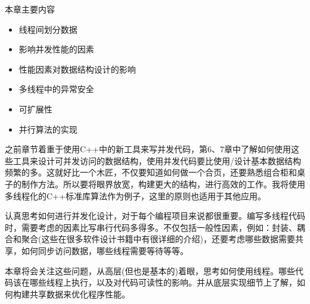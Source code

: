 
本章主要内容

\begin{itemize}
    \item 线程间划分数据
    \item 影响并发性能的因素
    \item 性能因素对数据结构设计的影响
    \item 多线程中的异常安全
    \item 可扩展性
    \item 并行算法的实现
\end{itemize}

之前章节着重于使用C++中的新工具来写并发代码，第6、7章中了解如何使用这些工具来设计可并发访问的数据结构，使用并发代码要比使用/设计基本数据结构频繁的多。这就好比一个木匠，不仅要知道如何做一个合页，还要熟悉组合柜和桌子的制作方法。所以要将眼界放宽，构建更大的结构，进行高效的工作。我将使用多线程化的C++标准库算法作为例子，这里的原则也适用于其他应用。

认真思考如何进行并发化设计，对于每个编程项目来说都很重要。编写多线程代码时，需要考虑的因素比写串行代码多得多。不仅包括一般性因素，例如：封装、耦合和聚合(这些在很多软件设计书籍中有很详细的介绍)，还要考虑哪些数据需要共享，如何同步访问数据，哪些线程需要等待等等。

本章将会关注这些问题，从高层(但也是基本的)着眼，思考如何使用线程。哪些代码该在哪些线程上执行，以及对代码可读性的影响。并从底层实现细节上了解，如何构建共享数据来优化程序性能。
